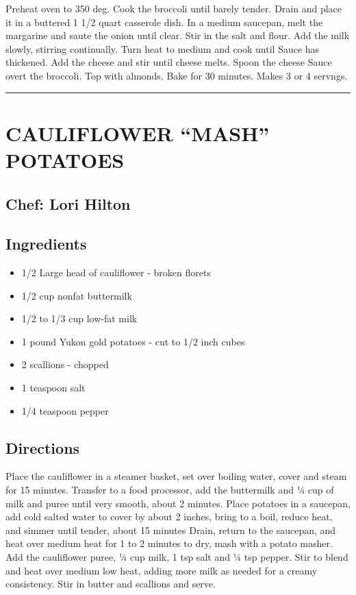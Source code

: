 \documentclass[
]{book}
\providecommand{\tightlist}{%
  \setlength{\itemsep}{0pt}\setlength{\parskip}{0pt}}
\begin{document}
Preheat oven to 350 deg. Cook the broccoli until barely tender. Drain and
place it in a buttered 1 1/2 quart casserole dish. In a medium saucepan, melt
the margarine and saute the onion until clear. Stir in the salt and flour.
Add the milk slowly, stirring continually. Turn heat to medium and cook until
Sauce has thickened. Add the cheese and stir until cheese melts. Spoon the cheese
Sauce overt the broccoli. Top with almonds. Bake for 30 minutes. Makes 3 or 4 servngs.

\begin{center}\rule{0.5\linewidth}{0.5pt}\end{center}

\hypertarget{cauliflower-mash-potatoes}{%
\section*{CAULIFLOWER ``MASH'' POTATOES}\label{cauliflower-mash-potatoes}}


\hypertarget{chef-lori-hilton-2}{%
\subsection*{Chef: Lori Hilton}\label{chef-lori-hilton-2}}


\hypertarget{ingredients-28}{%
\subsection*{Ingredients}\label{ingredients-28}}


\begin{itemize}
\tightlist
\item
  1/2 Large head of cauliflower - broken florets
\item
  1/2 cup nonfat buttermilk
\item
  1/2 to 1/3 cup low-fat milk
\item
  1 pound Yukon gold potatoes - cut to 1/2 inch cubes
\item
  2 scallions - chopped
\item
  1 teaspoon salt
\item
  1/4 teaspoon pepper
\end{itemize}

\hypertarget{directions-28}{%
\subsection*{Directions}\label{directions-28}}


Place the cauliflower in a steamer basket, set over boiling water,
cover and steam for 15 minutes. Transfer to a food processor, add
the buttermilk and ¼ cup of milk and puree until very smooth, about 2
minutes. Place potatoes in a saucepan, add cold salted water to cover
by about 2 inches, bring to a boil, reduce heat, and simmer until tender,
about 15 minutes Drain, return to the saucepan, and heat over
medium heat for 1 to 2 minutes to dry, mash with a potato masher.
Add the cauliflower puree, ¼ cup milk, 1 tsp salt and ¼ tsp pepper.
Stir to blend and heat over medium low heat, adding more milk as
needed for a creamy consistency. Stir in butter and scallions and serve.
\end{document}
